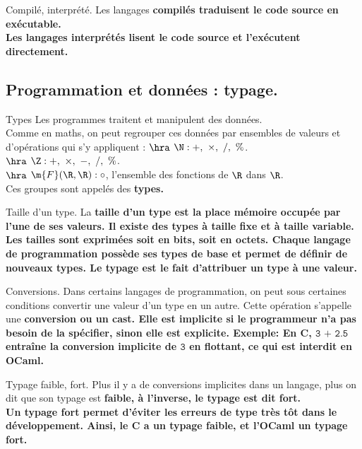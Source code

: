 \documentclass[french, 11pt]{article}
\begin{document}
\begin{defi}{Compilé, interprété.}{}
    Les langages \bf{compilés} traduisent le code source en exécutable.\\
    Les langages \bf{interprétés} lisent le code source et l'exécutent directement.
\end{defi}

\subsection{Programmation et données : typage.}

\begin{defi}{Types}{}
    Les programmes traitent et manipulent des données.\\
    Comme en maths, on peut regrouper ces données par ensembles de valeurs et d'opérations qui s'y appliquent :
    $\hra$ $\N : +,~\times,~/,~\%$.\\
    $\hra$ $\Z : +,~\times,~-,~/,~\%$.\\
    $\hra$ $\m{F}(\R,\R) : \circ$, l'ensemble des fonctions de $\R$ dans $\R$.\\
    Ces groupes sont appelés des \bf{types}.
\end{defi}

\begin{defi}{Taille d'un type.}{}
    La \bf{taille} d'un type est la place mémoire occupée par l'une de ses valeurs. Il existe des types à taille fixe et à taille variable. Les tailles sont exprimées soit en bits, soit en octets.\n
    Chaque langage de programmation possède ses types de base et permet de définir de nouveaux types. Le typage est le fait d'attribuer un type à une valeur.
\end{defi}

\begin{defi}{Conversions.}{}
    Dans certains langages de programmation, on peut sous certaines conditions convertir une valeur d'un type en un autre. Cette opération s'appelle une \bf{conversion} ou un cast. Elle est \bf{implicite} si le programmeur n'a pas besoin de la spécifier, sinon elle est \bf{explicite}.\n
    \bf{Exemple:} En C, $\texttt{3 + 2.5}$ entraîne la conversion implicite de $\texttt{3}$ en flottant, ce qui est interdit en OCaml.
\end{defi}

\begin{defi}{Typage faible, fort.}{}
    Plus il y a de conversions implicites dans un langage, plus on dit que son typage est \bf{faible}, à l'inverse, le typage est dit \bf{fort}.\\
    Un typage fort permet d'éviter les erreurs de type très tôt dans le développement.\n
    Ainsi, le C a un typage faible, et l'OCaml un typage fort.
\end{defi}
\end{document}
